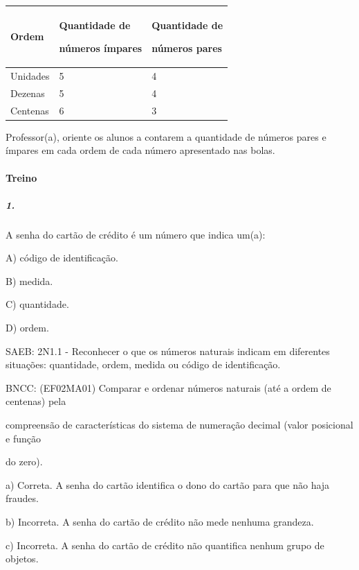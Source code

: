 \begin{longtable}[]{@{}lll@{}}
\toprule
\begin{minipage}[b]{0.32\columnwidth}\raggedright\strut
Ordem\strut
\end{minipage} & \begin{minipage}[b]{0.32\columnwidth}\raggedright\strut
Quantidade de

números ímpares\strut
\end{minipage} & \begin{minipage}[b]{0.32\columnwidth}\raggedright\strut
Quantidade de

números pares\strut
\end{minipage}\tabularnewline
\midrule
\endhead
Unidades & 5 & 4\tabularnewline
Dezenas & 5 & 4\tabularnewline
Centenas & 6 & 3\tabularnewline
\bottomrule
\end{longtable}

Professor(a), oriente os alunos a contarem a quantidade de números pares
e ímpares em cada ordem de cada número apresentado nas bolas.

\paragraph{Treino}\label{treino}

\subparagraph{1.}\label{section-11}

A senha do cartão de crédito é um número que indica um(a):

A) código de identificação.

B) medida.

C) quantidade.

D) ordem.

SAEB: 2N1.1 - Reconhecer o que os números naturais indicam em diferentes
situações: quantidade, ordem, medida ou código de identificação.

BNCC: (EF02MA01) Comparar e ordenar números naturais (até a ordem de
centenas) pela

compreensão de características do sistema de numeração decimal (valor
posicional e função

do zero).

a) Correta. A senha do cartão identifica o dono do cartão para que não
haja fraudes.

b) Incorreta. A senha do cartão de crédito não mede nenhuma grandeza.

c) Incorreta. A senha do cartão de crédito não quantifica nenhum grupo
de objetos.

